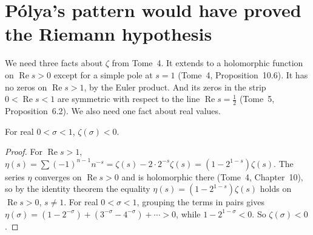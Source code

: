 \section{P\'olya's pattern would have proved the Riemann hypothesis}

We need three facts about $\zeta$ from Tome~4. It extends to a holomorphic function on $\operatorname{Re}s>0$ except for a simple pole at $s=1$
(Tome~4, Proposition~10.6). It has no zeros on $\operatorname{Re}s>1$, by the Euler product. And its zeros in the strip $0<\operatorname{Re}s<1$ are symmetric
with respect to the line $\operatorname{Re}s=\frac12$ (Tome~5, Proposition~6.2). We also need one fact about real values.

\begin{lemma}\label{lem:zetaneg}
For real $0<\sigma<1$, $\zeta(\sigma)<0$.
\end{lemma}
\begin{proof}
For $\operatorname{Re}s>1$, $\eta(s)=\sum(-1)^{n-1}n^{-s}=\zeta(s)-2\cdot2^{-s}\zeta(s)=(1-2^{1-s})\zeta(s)$. The series $\eta$ converges on $\operatorname{Re}s>0$
and is holomorphic there (Tome~4, Chapter~10), so by the identity theorem the equality $\eta(s)=(1-2^{1-s})\zeta(s)$ holds on $\operatorname{Re}s>0$, $s\ne1$. For real
$0<\sigma<1$, grouping the terms in pairs gives $\eta(\sigma)=(1-2^{-\sigma})+(3^{-\sigma}-4^{-\sigma})+\cdots>0$, while $1-2^{1-\sigma}<0$. So $\zeta(\sigma)<0$.
\end{proof}

